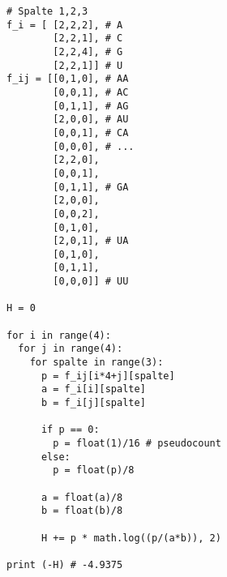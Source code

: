 \documentclass{homework}
\begin{document}
\begin{enumerate}
\begin{itemize}
\begin{verbatim}
# Spalte 1,2,3
f_i = [	[2,2,2], # A
        [2,2,1], # C
        [2,2,4], # G
        [2,2,1]] # U
f_ij = [[0,1,0], # AA
        [0,0,1], # AC
        [0,1,1], # AG
        [2,0,0], # AU
        [0,0,1], # CA
        [0,0,0], # ...
        [2,2,0],
        [0,0,1],
        [0,1,1], # GA
        [2,0,0],
        [0,0,2],
        [0,1,0],
        [2,0,1], # UA
        [0,1,0],
        [0,1,1],
        [0,0,0]] # UU

H = 0

for i in range(4):
  for j in range(4): 
    for spalte in range(3):
      p = f_ij[i*4+j][spalte]
      a = f_i[i][spalte]
      b = f_i[j][spalte]
      
      if p == 0:
        p = float(1)/16 # pseudocount
      else:
        p = float(p)/8
      
      a = float(a)/8
      b = float(b)/8
      
      H += p * math.log((p/(a*b)), 2)
      
print (-H) # -4.9375
\end{verbatim}	
	
\end{itemize}


\end{enumerate}
\end{document}
